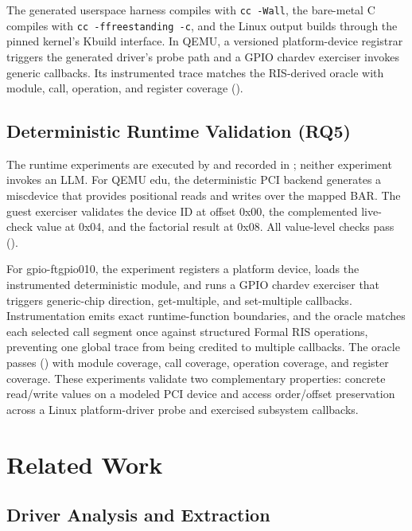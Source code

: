 \documentclass[sigconf,review]{acmart}
\begin{document}
The generated userspace harness compiles with \texttt{cc -Wall}, the bare-metal C compiles with \texttt{cc -ffreestanding -c}, and the Linux output builds through the pinned kernel's Kbuild interface. In QEMU, a versioned platform-device registrar triggers the generated driver's probe path and a GPIO chardev exerciser invokes generic callbacks. Its instrumented trace matches the RIS-derived oracle with \FTQEMUModuleCoverage{} module, \FTQEMUCallCoverage{} call, \FTQEMUOpCoverage{} operation, and \FTQEMURegisterCoverage{} register coverage (\texttt{\FTQEMUOracle}).

\subsection{Deterministic Runtime Validation (RQ5)}

The runtime experiments are executed by  and recorded in ; neither experiment invokes an LLM. For QEMU edu, the deterministic PCI backend generates a miscdevice that provides positional reads and writes over the mapped BAR. The guest exerciser validates the device ID at offset 0x00, the complemented live-check value at 0x04, and the factorial result at 0x08. All value-level checks pass (\texttt{\EduQEMUOracle}).

For gpio-ftgpio010, the experiment registers a platform device, loads the instrumented deterministic module, and runs a GPIO chardev exerciser that triggers generic-chip direction, get-multiple, and set-multiple callbacks. Instrumentation emits exact runtime-function boundaries, and the oracle matches each selected call segment once against structured Formal RIS operations, preventing one global trace from being credited to multiple callbacks. The oracle passes (\texttt{\FTQEMUOracle}) with \FTQEMUModuleCoverage{} module coverage, \FTQEMUCallCoverage{} call coverage, \FTQEMUOpCoverage{} operation coverage, and \FTQEMURegisterCoverage{} register coverage. These experiments validate two complementary properties: concrete read/write values on a modeled PCI device and access order/offset preservation across a Linux platform-driver probe and exercised subsystem callbacks.

\section{Related Work}

\subsection{Driver Analysis and Extraction}
\end{document}
